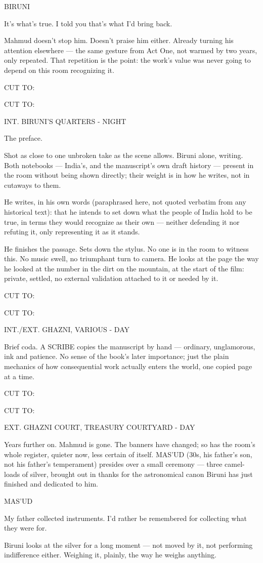 \documentclass[12pt]{article}
\newcommand{\sceneheading}[1]{%
  \needspace{4\baselineskip}%
  \par\vspace{1\baselineskip}\noindent #1\par\vspace{0.6\baselineskip}%
}
\newcommand{\action}[1]{%
  \par\noindent #1\par\vspace{0.6\baselineskip}%
}
\newcommand{\transition}[1]{%
  \par\vspace{0.3\baselineskip}%
  \ifthenelse{\equal{#1}{FADE IN:}}%
    {\noindent #1\par}%
    {\noindent\hfill #1\par}%
  \vspace{0.6\baselineskip}%
}
\newcommand{\charcue}[1]{%
  \needspace{3\baselineskip}%
  \par\vspace{0.3\baselineskip}\noindent\hspace*{2.2in}#1\par%
}
\newenvironment{dialogue}{%
  \begin{list}{}{%
    \setlength{\leftmargin}{1.1in}%
    \setlength{\rightmargin}{1.6in}%
    \setlength{\listparindent}{0pt}%
    \setlength{\itemindent}{0pt}%
    \setlength{\parsep}{0pt}%
    \setlength{\itemsep}{0pt}%
    \setlength{\topsep}{0pt}%
  }\item[]%
}{%
  \end{list}\vspace{0.4\baselineskip}%
}
\begin{document}
\charcue{BIRUNI}
\begin{dialogue}
It's what's true. I told you that's what I'd bring back.\\
\end{dialogue}
\action{Mahmud doesn't stop him. Doesn't praise him either. Already turning his attention elsewhere --- the same gesture from Act One, not warmed by two years, only repeated. That repetition is the point: the work's value was never going to depend on this room recognizing it.}
\transition{CUT TO:}
\sceneheading{INT. BIRUNI'S QUARTERS - NIGHT}
\action{The preface.}
\action{Shot as close to one unbroken take as the scene allows. Biruni alone, writing. Both notebooks --- India's, and the manuscript's own draft history --- present in the room without being shown directly; their weight is in how he writes, not in cutaways to them.}
\action{He writes, in his own words (paraphrased here, not quoted verbatim from any historical text): that he intends to set down what the people of India hold to be true, in terms they would recognize as their own --- neither defending it nor refuting it, only representing it as it stands.}
\action{He finishes the passage. Sets down the stylus. No one is in the room to witness this. No music swell, no triumphant turn to camera. He looks at the page the way he looked at the number in the dirt on the mountain, at the start of the film: private, settled, no external validation attached to it or needed by it.}
\transition{CUT TO:}
\sceneheading{INT./EXT. GHAZNI, VARIOUS - DAY}
\action{Brief coda. A SCRIBE copies the manuscript by hand --- ordinary, unglamorous, ink and patience. No sense of the book's later importance; just the plain mechanics of how consequential work actually enters the world, one copied page at a time.}
\transition{CUT TO:}
\sceneheading{EXT. GHAZNI COURT, TREASURY COURTYARD - DAY}
\action{Years further on. Mahmud is gone. The banners have changed; so has the room's whole register, quieter now, less certain of itself. MAS'UD (30s, his father's son, not his father's temperament) presides over a small ceremony --- three camel-loads of silver, brought out in thanks for the astronomical canon Biruni has just finished and dedicated to him.}
\charcue{MAS'UD}
\begin{dialogue}
My father collected instruments. I'd rather be remembered for collecting what they were for.\\
\end{dialogue}
\action{Biruni looks at the silver for a long moment --- not moved by it, not performing indifference either. Weighing it, plainly, the way he weighs anything.}
\end{document}
